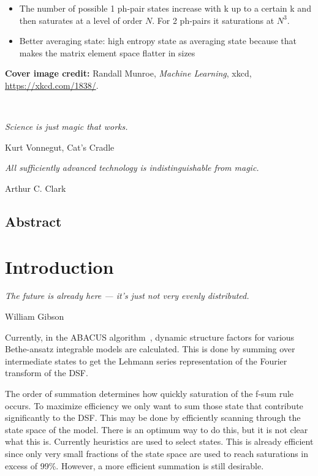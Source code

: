\documentclass[11pt, a4paper]{report} %
\begin{document}
\newpage
\thispagestyle{empty}


\begin{itemize}
\item The number of possible 1 ph-pair states increase with k up to a certain k and then saturates at a level of order $N$. For 2 ph-pairs it saturations at $N^3$.
\item Better averaging state: high entropy state as averaging state because that makes the matrix element space flatter in sizes 
\end{itemize}

\vfill
\noindent
\textbf{Cover image credit:} Randall Munroe, \textit{Machine Learning}, xkcd, \href{https://xkcd.com/1838/}{https://xkcd.com/1838/}.

\newpage
\thispagestyle{empty}
\ 
\vspace{6cm}

\epigraph{\textit{Science is just magic that works.}}{Kurt Vonnegut, Cat's Cradle}

\epigraph{\textit{All sufficiently advanced technology is indistinguishable from magic.}}{Arthur C. Clark}



\tableofcontents

\newpage

\section*{Abstract}

\chapter{Introduction}

\epigraph{\textit{The future is already here --- it's just not very evenly distributed.}}{William Gibson}

Currently, in the ABACUS algorithm~\cite{Caux2009}, dynamic structure factors for various Bethe-ansatz integrable models are calculated.
This is done by summing over intermediate states to get the Lehmann series representation of the Fourier transform of the DSF.

The order of summation determines how quickly saturation of the f-sum rule occurs.
To maximize efficiency we only want to sum those state that contribute significantly to the DSF.
This may be done by efficiently scanning through the state space of the model.
There is an optimum way to do this, but it is not clear what this is.
Currently heuristics are used to select states.
This is already efficient since only very small fractions of the state space are used to reach saturations in excess of 99\%.
However, a more efficient summation is still desirable.
\end{document}
